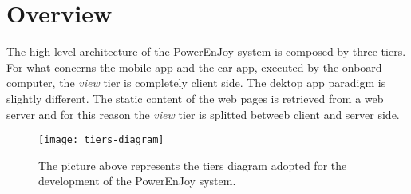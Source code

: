 \section{Overview}
The high level architecture of the PowerEnJoy system is composed by three tiers. For what concerns the mobile app and the car app, executed by the onboard computer, the \textit{view} tier is completely client side. The dektop app paradigm is slightly different. The static content of the web pages is retrieved from a web server and for this reason the \textit{view} tier is splitted betweeb client and server side.

\begin{figure}[H]
	\centering
	\texttt{[image: tiers-diagram]}
	\caption[Tiers diagram]{The picture above represents the tiers diagram adopted for the development of the PowerEnJoy system.}
	\label{fig:tiers-diagram}
\end{figure}
